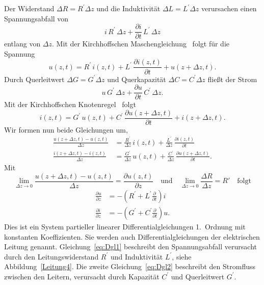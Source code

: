 \documentclass[paper=a4, parskip=half-, ngerman, fontsize=11pt]{scrreprt}
\begin{document}
Der Widerstand $\Delta R = R^{\prime} \Delta z$ und die Induktivität $\Delta L = L^{\prime} \Delta z$ verursachen einen
Spannungsabfall von
\[
i \, R^{\prime} \, \Delta z + \frac{\partial i}{\partial t} \, L^{\prime} \, \Delta z
\]
entlang von $\Delta z$. Mit der Kirchhoffschen Maschengleichung~\cite{Kirchhoff} folgt für die Spannung
\begin{equation*}
u(z, t) = R^{\prime} \, i(z, t) + L^{\prime} \, \frac{\partial i(z, t)}{\partial t} + u(z + \Delta z, t).
\end{equation*}
Durch Querleitwert $\Delta G = G^{\prime} \Delta z$ und Querkapazität $\Delta C = C^{\prime} \Delta z$ fließt der Strom
\[
u \, G^{\prime} \, \Delta z + \frac{\partial u}{\partial t} \, C^{\prime} \, \Delta z.
\]
Mit der Kirchhoffschen Knotenregel~\cite{Kirchhoff} folgt
\begin{equation*}
    i(z, t) = G^{\prime} \, u(z, t) + C^{\prime} \, \frac{\partial u(z + \Delta z, t)}{\partial t} + i(z + \Delta z, t).
\end{equation*}
Wir formen nun beide Gleichungen um,
\begin{align*}
\frac{u(z + \Delta z, t) - u(z, t)}{\Delta z} &= \frac{R^{\prime}}{\Delta z} \, i(z, t) + \frac{L^{\prime}}{\Delta z}
\,
\frac{\partial i(z, t)}{\partial t} \\
\frac{i(z + \Delta z, t) - i(z, t)}{\Delta z} &= \frac{G^{\prime}}{\Delta z} \, u(z, t) + \frac{C^{\prime}}{\Delta z}
\, \frac{\partial u(z + \Delta z, t)}{\partial t}.
\end{align*}
Mit
\[
\lim_{\Delta z \to 0} \frac{u(z+\Delta z, t)-u(z, t)}{\Delta z} = \frac{\partial u(z, t)}{\partial z} \quad \text{und}
\quad \lim_{\Delta z \to 0} \frac{\Delta R}{\Delta z} = R' \quad \text{folgt}
\]
\begin{align}
    \frac{\partial u}{\partial z} &= -\left(R^{\prime} + L^{\prime}\frac{\partial}{\partial t}\right)i \label{eq:Dgl1}
    \\[1ex]
    \frac{\partial i}{\partial z} &= -\left(G^{\prime} + C^{\prime}\frac{\partial}{\partial t}\right)u. \label{eq:Dgl2}
\end{align}
Dies ist ein System partieller linearer Differentialgleichungen 1.~Ordnung mit konstanten Koeffizienten. Sie werden
auch Differentialgleichungen der elektrischen Leitung genannt.
Gleichung~\eqref{eq:Dgl1} beschreibt den Spannungsabfall verursacht durch den Leitungswiderstand $R^{\prime}$ und
Induktivität $L^{\prime}$, siehe Abbildung~\ref{Leitung4}.
Die zweite Gleichung~\eqref{eq:Dgl2} beschreibt den Stromfluss zwischen den Leitern, verursacht durch Kapazität
$C^{\prime}$ und Querleitwert $G^{\prime}$.
\end{document}
